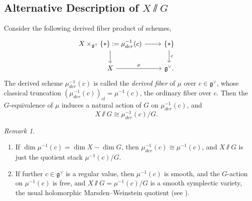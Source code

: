 \documentclass[12pt]{amsart}
\theoremstyle{definition}
\theoremstyle{remark}
\newtheorem{remark}[theorem]{Remark}
\numberwithin{equation}{section}
\begin{document}
\subsection[Alternative Description of X// G]{Alternative Description of $X\sslash G$}
Consider the following derived fiber product of schemes,
 \begin{equation*}
\begin{tikzcd}
X\times_{\mathfrak{g}^{\vee}} \{*\}:=\mu_{der}^{-1}(c) \arrow[r] \arrow[d]
& \{*\} \arrow[d, "c"] \\
 X \arrow[r, "\mu"] & \mathfrak{g}^{\vee}.
\end{tikzcd}
 \end{equation*}
The derived scheme $\mu_{der}^{-1}(c)$ is called the \emph{derived fiber} of $\mu$ over $c\in\mathfrak{g}^{\vee}$, whose classical truncation $(\mu_{der}^{-1}(c))_{cl}=\mu^{-1}(c)$, the ordinary fiber over $c$. Then the $G$-equivalence of $\mu$ induces a natural action of $G$ on $\mu_{der}^{-1}(c)$, and $$X\sslash  G\cong \mu_{der}^{-1}(c)/G.$$
\begin{remark}
    \begin{enumerate}
        \item If $\dim \mu^{-1}(c)=\dim X-\dim G$, then $\mu_{der}^{-1}(c)\cong \mu^{-1}(c)$, and $X\sslash  G$ is just the quotient stack $\mu^{-1}(c)/G$. 
        \item If further $c\in \mathfrak{g}^{\vee}$ is a regular value, then $\mu^{-1}(c)$ is smooth, and the $G$-action on $\mu^{-1}(c)$ is free, and $X\sslash  G=\mu^{-1}(c)/G$ is a smooth symplectic variety, the usual holomorphic Marsden–Weinstein quotient (see \cite{marsden1974reduction}). 
    \end{enumerate}
\end{remark}



%
%
%

%
%

\end{document}

